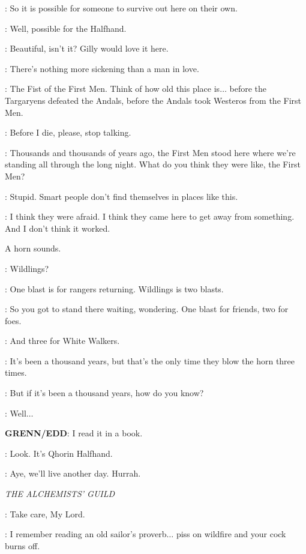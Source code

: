 \JON: So it is possible for someone to survive out here on their own. 

\JEOR: Well, possible for the Halfhand. 

\SAM: Beautiful, isn't it? Gilly would love it here. 

\EDD: There's nothing more sickening than a man in love. 


\SAM: The Fist of the First Men. Think of how old this place is$\ldots$ before the Targaryens defeated the Andals, before the Andals took Westeros from the First Men. 

\EDD: Before I die, please, stop talking. 

\SAM: Thousands and thousands of years ago, the First Men stood here where we're standing all through the long night. What do you think they were like, the First Men? 

\EDD: Stupid. Smart people don't find themselves in places like this. 

\JON: I think they were afraid. I think they came here to get away from something. And I don't think it worked. 

\sfx A horn sounds.

\GRENN: Wildlings? 

\JON: One blast is for rangers returning. Wildlings is two blasts. 

\EDD: So you got to stand there waiting, wondering. One blast for friends, two for foes. 

\SAM: And three for White Walkers. 


\SAM: It's been a thousand years, but that's the only time they blow the horn three times. 

\GRENN: But if it's been a thousand years, how do you know? 

\SAM: Well$\ldots$ 

\textbf{GRENN/EDD}: I read it in a book. 

\JON: Look. It's Qhorin Halfhand. 

\EDD: Aye, we'll live another day. Hurrah. 


\scene

\textit{THE ALCHEMISTS' GUILD}


\HALLYN: Take care, My Lord. 

\TYRION: I remember reading an old sailor's proverb$\ldots$ piss on wildfire and your cock burns off. 

